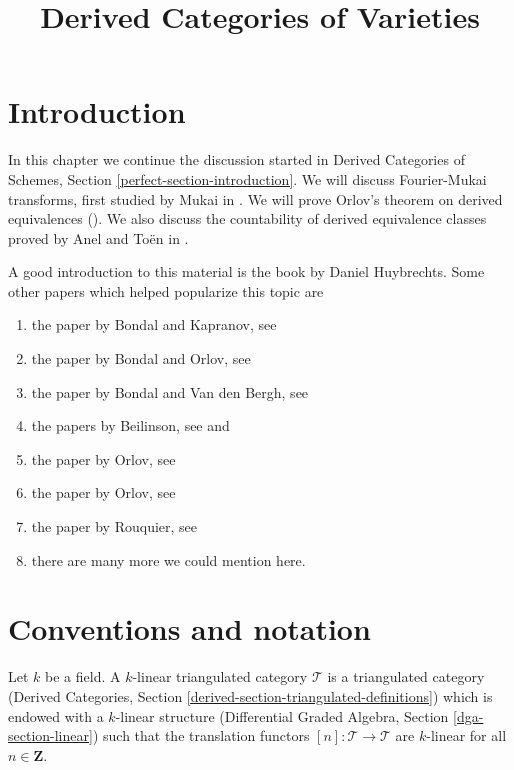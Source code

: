 \documentclass{stacks-project}
\theoremstyle{plain}
\theoremstyle{definition}
\theoremstyle{remark}
\numberwithin{equation}{subsection}
\begin{document}
\title{Derived Categories of Varieties}


\maketitle

\label{section-phantom}

\tableofcontents

\section{Introduction}
\label{section-introduction}

\noindent
In this chapter we continue the discussion started in
Derived Categories of Schemes, Section \ref{perfect-section-introduction}.
We will discuss Fourier-Mukai transforms,
first studied by Mukai in \cite{Mukai}.
We will prove Orlov's theorem on derived equivalences (\cite{Orlov-K3}).
We also discuss the countability of derived equivalence
classes proved by Anel and To\"en in \cite{AT}.

\medskip\noindent
A good introduction to this material is the book
\cite{Huybrechts} by Daniel Huybrechts. Some other
papers which helped popularize this topic are
\begin{enumerate}
\item the paper by Bondal and Kapranov, see \cite{Bondal-Kapranov}
\item the paper by Bondal and Orlov, see \cite{Bondal-Orlov}
\item the paper by Bondal and Van den Bergh, see \cite{BvdB}
\item the papers by Beilinson, see
\cite{Beilinson} and \cite{Beilinson-derived}
\item the paper by Orlov, see \cite{Orlov-AV}
\item the paper by Orlov, see \cite{Orlov-motives}
\item the paper by Rouquier, see \cite{Rouquier-dimensions}
\item there are many more we could mention here.
\end{enumerate}




\section{Conventions and notation}
\label{section-conventions}

\noindent
Let $k$ be a field. A $k$-linear triangulated category $\mathcal{T}$
is a triangulated category (Derived Categories, Section
\ref{derived-section-triangulated-definitions})
which is endowed with a $k$-linear structure
(Differential Graded Algebra, Section \ref{dga-section-linear})
such that the translation functors $[n] : \mathcal{T} \to \mathcal{T}$
are $k$-linear for all $n \in \mathbf{Z}$.
\end{document}
